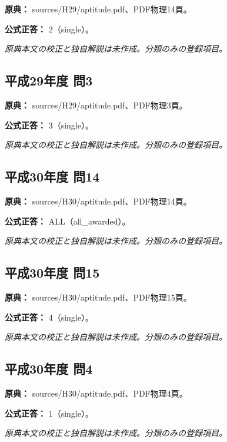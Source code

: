 \noindent\textbf{原典：} sources/H29/aptitude.pdf、PDF物理14頁。

\textbf{公式正答：} 2（single）。

\par\textit{原典本文の校正と独自解説は未作成。分類のみの登録項目。}

\subsection{平成29年度 問3}
\label{q:h29-reg-apt-03}

\noindent\textbf{原典：} sources/H29/aptitude.pdf、PDF物理3頁。

\textbf{公式正答：} 3（single）。

\par\textit{原典本文の校正と独自解説は未作成。分類のみの登録項目。}

\subsection{平成30年度 問14}
\label{q:h30-reg-apt-14}

\noindent\textbf{原典：} sources/H30/aptitude.pdf、PDF物理14頁。

\textbf{公式正答：} ALL（all\_awarded）。

\par\textit{原典本文の校正と独自解説は未作成。分類のみの登録項目。}

\subsection{平成30年度 問15}
\label{q:h30-reg-apt-15}

\noindent\textbf{原典：} sources/H30/aptitude.pdf、PDF物理15頁。

\textbf{公式正答：} 4（single）。

\par\textit{原典本文の校正と独自解説は未作成。分類のみの登録項目。}

\subsection{平成30年度 問4}
\label{q:h30-reg-apt-04}

\noindent\textbf{原典：} sources/H30/aptitude.pdf、PDF物理4頁。

\textbf{公式正答：} 1（single）。

\par\textit{原典本文の校正と独自解説は未作成。分類のみの登録項目。}

